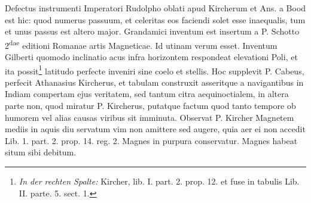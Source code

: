 
\pstart Defectus instrumenti Imperatori Rudolpho\protect{} oblati apud Kircherum\protect{} et Ans. a Bood\protect{} est hic: quod numerus passuum, et celeritas\protect{} eos faciendi solet esse inaequalis, tum et unus passus est altero major.
\pend 
\pstart Grandamici\protect{} inventum est insertum a P. Schotto\protect{} 2\textsuperscript{dae} editioni Romanae artis Magneticae. Id utinam verum esset. Inventum Gilberti\protect{} quomodo inclinatio\protect{} acus\protect{} infra horizontem respondeat elevationi Poli\protect{}, et ita possit\footnote{\textit{In der rechten Spalte:} Kircher, lib. I. part. 2. prop. 12. et fuse in tabulis Lib. II. parte. 5. sect. 1.} latitudo\protect{} perfecte inveniri sine coelo et stellis\protect{}. Hoc supplevit P. Cabeus\protect{}, perfecit Athanasius Kircherus\protect{}, et tabulam construxit asseritque a navigantibus in Indiam\protect{} compertam ejus veritatem, sed tantum citra aequinoctialem, in altera parte non, quod miratur P. Kircherus\protect{}, putatque factum quod  tanto tempore ob humorem vel alias causas viribus sit imminuta.
\pend 
\pstart Observat P. Kircher\protect{} Magnetem \protect{} mediis in aquis diu servatum vim non amittere sed augere, quia aer ei non accedit Lib. 1. part. 2. prop. 14. reg. 2. Magnes\protect{} in purpura conservatur. Magnes\protect{} habeat situm sibi debitum.
